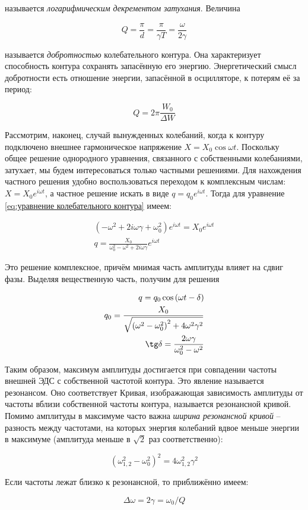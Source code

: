\noindent
называется \textit{логарифмическим декрементом затухания}. Величина

\begin{equation}
    Q = \frac{\pi}{d} = \frac{\pi}{\gamma T} = \frac{\omega}{2 \gamma}
\end{equation}

\noindent
называется \textit{добротностью} колебательного контура. Она характеризует способность контура сохранять запасённую его энергию. Энергетический смысл добротности есть отношение энергии, запасённой в осцилляторе, к потерям её за период:

\begin{equation}
    Q = 2 \pi \frac{W_0}{\Delta W}
\end{equation}

Рассмотрим, наконец, случай вынужденных колебаний, когда к контуру подключено внешнее гармоническое напряжение $X = X_0 \cos \omega t$. Поскольку общее решение однородного уравнения, связанного с собственными колебаниями, затухает, мы будем интересоваться только частными решениями. Для нахождения частного решения удобно воспользоваться переходом к комплексным числам: $X = X_0 e^{i \omega t}$, а частное решение искать в виде $q = q_0 e^{i \omega t}$. Тогда для уравнение \eqref{eq:уравнение колебательного контура} имеем:

\begin{align}
    \left( - \omega^2 + 2 i \omega \gamma + \omega_0^2 \right) e^{i \omega t} = X_0 e^{i \omega t} \\
    q = \frac{X_0}{\omega_0^2 - \omega^2 + 2 i \omega \gamma} e^{i \omega t}
\end{align}

\noindent
Это решение комплексное, причём мнимая часть амплитуды влияет на сдвиг фазы. Выделяя вещественную часть, получим для решения

\begin{align}
    q = q_0 \cos \left( \omega t - \delta \right) \\
    q_0 = \frac{X_0}{\sqrt{\left( \omega^2 - \omega_0^2 \right)^2 + 4 \omega^2 \gamma^2}} \\
    \tg \delta = \frac{2 \omega \gamma}{\omega_0^2 - \omega^2}
\end{align}

\noindent
Таким образом, максимум амплитуды достигается при совпадении частоты внешней ЭДС с собственной частотой контура. Это явление называется резонансом. Оно соответствует  Кривая, изображающая зависимость амплитуды от частоты вблизи собственной частоты контура, называется резонансной кривой. Помимо амплитуды в максимуме часто важна \textit{ширина резонансной кривой} -- разность между частотами, на которых энергия колебаний вдвое меньше энергии в максимуме (амплитуда меньше в $\sqrt{2}$ раз соответственно):

\begin{equation*}
    \left( \omega_{1, 2}^2 - \omega_0^2 \right)^2 = 4 \omega_{1, 2}^2 \gamma^2
\end{equation*}

\noindent
Если частоты лежат близко к резонансной, то приближённо имеем:

\begin{equation}
    \Delta \omega = 2 \gamma = \omega_0 / Q
\end{equation}
